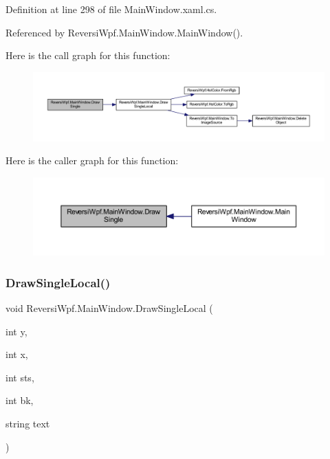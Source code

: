 Definition at line 298 of file Main\+Window.\+xaml.\+cs.



Referenced by Reversi\+Wpf.\+Main\+Window.\+Main\+Window().

Here is the call graph for this function\+:
\nopagebreak
\begin{figure}[H]
\begin{center}
\leavevmode
\includegraphics[width=350pt]{class_reversi_wpf_1_1_main_window_aa7f29f9037ca59f0b41d4b383875bb5e_cgraph}
\end{center}
\end{figure}
Here is the caller graph for this function\+:
\nopagebreak
\begin{figure}[H]
\begin{center}
\leavevmode
\includegraphics[width=350pt]{class_reversi_wpf_1_1_main_window_aa7f29f9037ca59f0b41d4b383875bb5e_icgraph}
\end{center}
\end{figure}
\mbox{\label{class_reversi_wpf_1_1_main_window_a88fd4a18ce06e08801a3370147bc3a8b}} 
\subsubsection{\texorpdfstring{Draw\+Single\+Local()}{DrawSingleLocal()}}
{\footnotesize\ttfamily void Reversi\+Wpf.\+Main\+Window.\+Draw\+Single\+Local (\begin{DoxyParamCaption}\item[{int}]{y,  }\item[{int}]{x,  }\item[{int}]{sts,  }\item[{int}]{bk,  }\item[{string}]{text }\end{DoxyParamCaption})}



